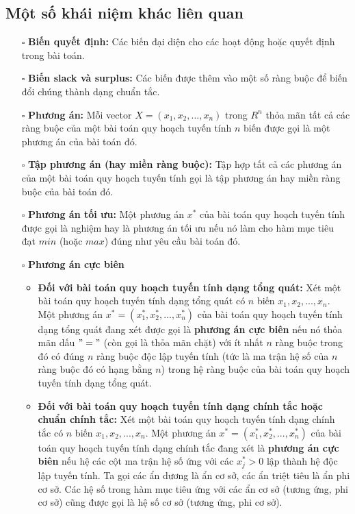 \documentclass{article}
\begin{document}
\subsection{Một số khái niệm khác liên quan}
\begin{itemize}
    \item [$\square$] \textbf{Biến quyết định:} Các biến đại diện cho các hoạt động hoặc quyết định trong bài toán.
    \item [$\square$] \textbf{Biến slack và surplus:} Các biến được thêm vào một số ràng buộc để biến đổi chúng thành dạng chuẩn tắc.
    \item [$\square$] \textbf{Phương án:} Mỗi vector $X=(x_1,x_2,...,x_n)$ trong $R^n$ thỏa mãn tất cả các ràng buộc của một bài toán quy hoạch tuyến tính $n$ biến được gọi là một phương án của bài toán đó.
    \item [$\square$] \textbf{Tập phương án (hay miền ràng buộc):} Tập hợp tất cả các phương án của một bài toán quy hoạch tuyến tính gọi là tập phương án hay miền ràng buộc của bài toán đó.
    \item [$\square$] \textbf{Phương án tối ưu:} Một phương án $x^*$ của bài toán quy hoạch tuyến tính được gọi là nghiệm hay là phương án tối ưu nếu nó làm cho hàm mục tiêu đạt $min$ (hoặc $max$) đúng như yêu cầu bài toán đó.
    \item [$\square$] \textbf{Phương án cực biên}
        \begin{itemize}[label=\textbullet]
            \item \textbf{Đối với bài toán quy hoạch tuyến tính dạng tổng quát:} Xét một bài toán quy hoạch tuyến tính dạng tổng quát có $n$ biến $x_1, x_2,...,x_n$. Một phương án $x^* =(x^*_1, x^*_2,...,x^*_n) $ của bài toán quy hoạch tuyến tính dạng tổng quát đang xét được gọi là \textbf{phương án cực biên} nếu nó thỏa mãn dấu $"="$ (còn gọi là thỏa mãn chặt) với ít nhất $n$ ràng buộc trong đó có đúng $n$ ràng buộc độc lập tuyến tính (tức là ma trận hệ số của $n$ ràng buộc đó có hạng bằng $n$) trong hệ ràng buộc của bài toán quy hoạch tuyến tính dạng tổng quát.
            \item \textbf{Đối với bài toán quy hoạch tuyến tính dạng chính tắc hoặc chuẩn chính tắc:} Xét một bài toán quy hoạch tuyến tính dạng chính tắc có $n$ biến $x_1, x_2,...,x_n$. Một phương án $x^* =(x^*_1, x^*_2,...,x^*_n) $ của bài toán quy hoạch tuyến tính dạng chính tắc đang xét là \textbf{phương án cực biên} nếu hệ các cột ma trận hệ số ứng với các $x^*_j > 0$ lập thành hệ độc lập tuyến tính. Ta gọi các ẩn dương là ẩn cơ sở, các ẩn triệt tiêu là ẩn phi cơ sở. Các hệ số trong hàm mục tiêu ứng với các ẩn cơ sở (tương ứng, phi cơ sở) cũng được gọi là hệ số cơ sở (tương ứng, phi cơ sở). 

\end{itemize}
\end{itemize}
\end{document}
